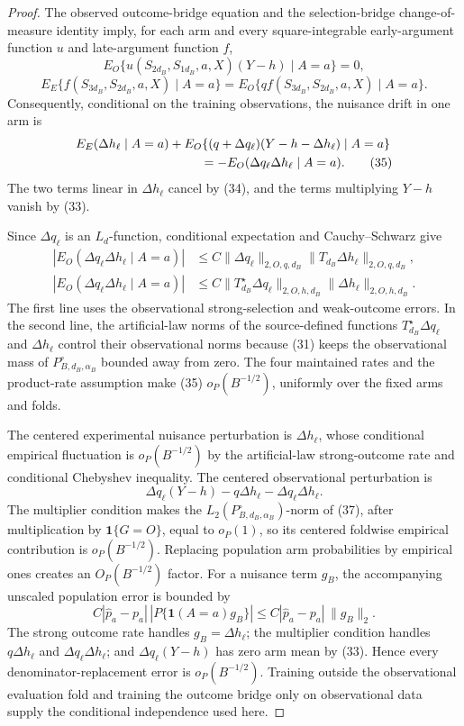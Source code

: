 \documentclass{article}
\begin{document}
\begin{proof}
The observed outcome-bridge equation and the selection-bridge change-of-measure identity imply, for each arm and every square-integrable early-argument function \(u\) and late-argument function \(f\),
\[
 E_O\{u(S_{2d_B},S_{1d_B},a,X)(Y-h)\mid A=a\}=0,             \tag{33}
\]
\[
 E_E\{f(S_{3d_B},S_{2d_B},a,X)\mid A=a\}
 =E_O\{qf(S_{3d_B},S_{2d_B},a,X)\mid A=a\}.                 \tag{34}
\]
Consequently, conditional on the training observations, the nuisance drift in one arm is
\[
\begin{aligned}
 &E_E(\Delta h_\ell\mid A=a)
 +E_O\{(q+\Delta q_\ell)(Y-h-\Delta h_\ell)\mid A=a\}\\
 &\hspace{35mm}=-E_O(\Delta q_\ell\Delta h_\ell\mid A=a).   \tag{35}
\end{aligned}
\]
The two terms linear in \(\Delta h_\ell\) cancel by (34), and the terms multiplying \(Y-h\) vanish by (33).

Since \(\Delta q_\ell\) is an \(L_d\)-function, conditional expectation and Cauchy--Schwarz give
\[
\begin{aligned}
 |E_O(\Delta q_\ell\Delta h_\ell\mid A=a)|
 &\le C\|\Delta q_\ell\|_{2,O,q,d_B}
          \|T_{d_B}\Delta h_\ell\|_{2,O,q,d_B},\\
 |E_O(\Delta q_\ell\Delta h_\ell\mid A=a)|
 &\le C\|T_{d_B}^{\star}\Delta q_\ell\|_{2,O,h,d_B}
          \|\Delta h_\ell\|_{2,O,h,d_B}.                   \tag{36}
\end{aligned}
\]
The first line uses the observational strong-selection and weak-outcome errors.  In the second line, the artificial-law norms of the source-defined functions \(T_{d_B}^{\star}\Delta q_\ell\) and \(\Delta h_\ell\) control their observational norms because (31) keeps the observational mass of \(P_{B,d_B,\alpha_B}^{\circ}\) bounded away from zero.  The four maintained rates and the product-rate assumption make (35) \(o_P(B^{-1/2})\), uniformly over the fixed arms and folds.

The centered experimental nuisance perturbation is \(\Delta h_\ell\), whose conditional empirical fluctuation is \(o_P(B^{-1/2})\) by the artificial-law strong-outcome rate and conditional Chebyshev inequality.  The centered observational perturbation is
\[
 \Delta q_\ell(Y-h)-q\Delta h_\ell-\Delta q_\ell\Delta h_\ell. \tag{37}
\]
The multiplier condition makes the \(L_2(P_{B,d_B,\alpha_B}^{\circ})\)-norm of (37), after multiplication by \(\mathbf1\{G=O\}\), equal to \(o_P(1)\), so its centered foldwise empirical contribution is \(o_P(B^{-1/2})\).  Replacing population arm probabilities by empirical ones creates an \(O_P(B^{-1/2})\) factor.  For a nuisance term \(g_B\), the accompanying unscaled population error is bounded by
\[
 C|\widehat p_a-p_a|\,|P\{\mathbf1(A=a)g_B\}|
 \le C|\widehat p_a-p_a|\,\|g_B\|_2.                        \tag{38}
\]
The strong outcome rate handles \(g_B=\Delta h_\ell\); the multiplier condition handles \(q\Delta h_\ell\) and \(\Delta q_\ell\Delta h_\ell\); and \(\Delta q_\ell(Y-h)\) has zero arm mean by (33).  Hence every denominator-replacement error is \(o_P(B^{-1/2})\).  Training outside the observational evaluation fold and training the outcome bridge only on observational data supply the conditional independence used here.


\end{proof}
\end{document}
